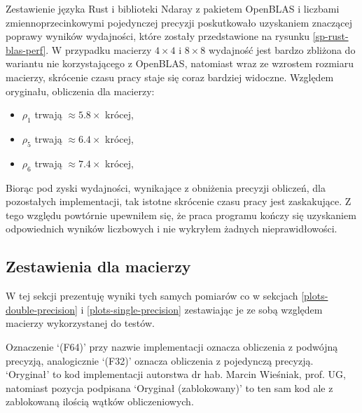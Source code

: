 \documentclass[11pt, a4paper]{article}
\begin{document}
\begin{sloppypar}
    Zestawienie języka Rust i biblioteki Ndaray z pakietem OpenBLAS i liczbami zmiennoprzecinkowymi
    pojedynczej precyzji poskutkowało uzyskaniem znaczącej poprawy wyników wydajności,
    które zostały przedstawione na rysunku \ref{sp-rust-blas-perf}. W przypadku macierzy
    $4\times4$ i $8\times8$ wydajność jest bardzo zbliżona do wariantu nie korzystającego
    z OpenBLAS, natomiast wraz ze wzrostem rozmiaru macierzy, skrócenie czasu pracy staje
    się coraz bardziej widoczne. Względem oryginału, obliczenia dla macierzy:
    \begin{itemize}
      \item $\rho_{1}$ trwają $\approx 5.8\times$ krócej,

      \item $\rho_{5}$ trwają $\approx 6.4\times$ krócej,

      \item $\rho_{6}$ trwają $\approx 7.4\times$ krócej,
    \end{itemize}
    Biorąc pod zyski wydajności, wynikające z obniżenia precyzji obliczeń, dla
    pozostałych implementacji, tak istotne skrócenie czasu pracy jest zaskakujące. Z
    tego względu powtórnie upewniłem się, że praca programu kończy się uzyskaniem odpowiednich
    wyników liczbowych i nie wykryłem żadnych nieprawidłowości.

    \FloatBarrier

    \subsection{Zestawienia dla macierzy}
    W tej sekcji prezentuję wyniki tych samych pomiarów co w sekcjach
    \ref{plots-double-precision} i \ref{plots-single-precision} zestawiając je ze sobą
    względem macierzy wykorzystanej do testów.

    Oznaczenie `(F64)' przy nazwie implementacji oznacza obliczenia z podwójną precyzją,
    analogicznie `(F32)' oznacza obliczenia z pojedynczą precyzją. `Oryginał' to kod
    implementacji autorstwa dr hab. Marcin Wieśniak, prof. UG, natomiast pozycja
    podpisana `Oryginał (zablokowany)' to ten sam kod ale z zablokowaną ilością wątków
    obliczeniowych.


\end{sloppypar}
\end{document}
